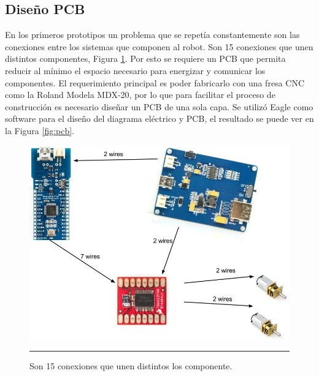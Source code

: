 \subsection{Diseño PCB}

En los primeros prototipos un problema que se repetía constantemente son las conexiones entre los sistemas que componen al robot. Son 15 conexiones que unen distintos componentes, Figura \ref{fig:Diagrama cables}. Por esto se requiere un PCB que permita reducir al mínimo el espacio necesario para energizar y comunicar los componentes. El requerimiento principal es poder fabricarlo con una fresa CNC como la Roland Modela MDX-20, por lo que para facilitar el proceso de construcción es necesario diseñar un PCB de una sola capa. Se utilizó Eagle como software para el diseño del diagrama eléctrico y PCB, el resultado se puede ver en la Figura \ref{fig:pcb}.


\begin{figure}[htbp]
	\centering
		\includegraphics[width=\textwidth]{./Figures/Diagrama.jpg}
		\rule{35em}{0.5pt}
	\caption[Diagrama de conexiones eléctricas necesarias para unir todos los componentes]{Son 15 conexiones que unen distintos los componente.}
	\label{fig:Diagrama cables}
\end{figure}	

